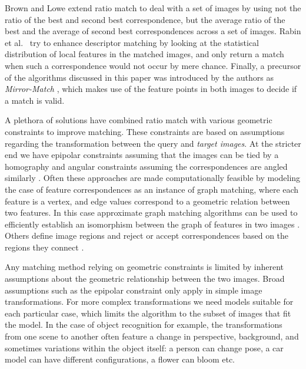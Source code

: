 \documentclass[review]{elsarticle}
\begin{document}
Brown and Lowe \cite{brown2005multi} extend ratio match to deal with a set of images by using not the ratio of the best and second best correspondence, but the average ratio of the best and the average of second best correspondences across a set of images.  Rabin et al.\ \cite{rabin2009statistical} try to enhance descriptor matching by looking at the statistical distribution of local features in the matched images, and only return a match when such a correspondence would not occur by mere chance. Finally, a precursor of the algorithms discussed in this paper was introduced by the authors as \emph{Mirror-Match} \cite{arnfred2013mirror}, which makes use of the feature points in both images to decide if a match is valid.

A plethora of solutions have combined ratio match with various geometric constraints to improve matching. These constraints are based on assumptions regarding the transformation between the query and \emph{target images}. At the stricter end we have epipolar constraints assuming that the images can be tied by a homography \cite{torr2000mlesac, chum2005matching} and angular constraints assuming the correspondences are angled similarly \cite{kim2008efficient, schmid1997local}. Often these approaches are made computationally feasible by modeling the case of feature correspondences as an instance of graph matching, where each feature is a vertex, and edge values correspond to a geometric relation between two features. In this case approximate graph matching algorithms can be used to efficiently establish an isomorphism between the graph of features in two images \cite{leordeanu2005spectral, torresani2008feature, yarkony2010covering, yuan2012efficient}. Others define image regions and reject or accept correspondences based on the regions they connect \cite{cho2009feature, wu2011robust}.

Any matching method relying on geometric constraints is limited by inherent assumptions about the geometric relationship between the two images. Broad assumptions such as the epipolar constraint only apply in simple image transformations. For more complex transformations we need models suitable for each particular case, which limits the algorithm to the subset of images that fit the model.  In the case of object recognition for example, the transformations from one scene to another often feature a change in perspective, background, and sometimes variations within the object itself: a person can change pose, a car model can have different configurations, a flower can bloom etc.
\end{document}
